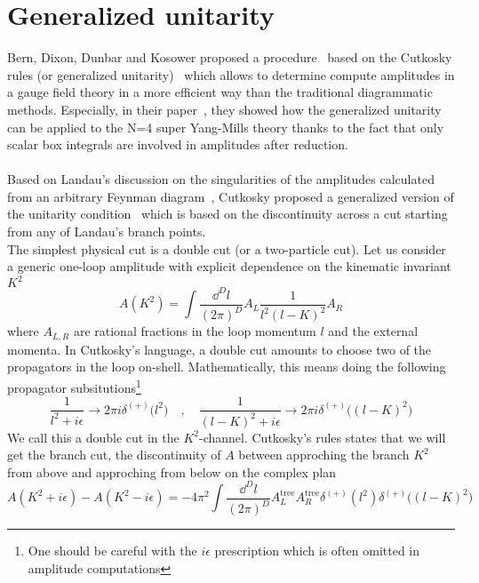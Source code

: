 \section{Generalized unitarity}\label{sect-unitarity}
Bern, Dixon, Dunbar and Kosower proposed a procedure~\cite{Bern:1994zx} based on the Cutkosky rules (or generalized unitarity)~\cite{doi:10.1063/1.1703676} which allows to determine compute amplitudes in a gauge field theory in a more efficient way than the traditional diagrammatic methods. 
Especially, in their paper~\cite{Bern:1994zx}, they showed how the generalized unitarity can be applied to the N=4 super Yang-Mills theory thanks to the fact that only scalar box integrals are involved in amplitudes after reduction.
\\\\
Based on Landau's discussion on the singularities of the amplitudes calculated from an arbitrary Feynman diagram~\cite{LANDAU1959181}, 
Cutkosky proposed a generalized version of the unitarity condition~\cite{doi:10.1063/1.1703676} which is based on the discontinuity across a cut starting from any of Landau's branch points.
\\
The simplest physical cut is a double cut (or a two-particle cut).
Let us consider a generic one-loop amplitude with explicit dependence on the kinematic invariant $K^2$
\begin{equation*}
A(K^2) = \int\frac{\dd^D l}{(2\pi)^D} A_L\frac{1}{l^{2} (l-K)^{2}}A_R
\end{equation*}
where $A_{L,R}$ are rational fractions in the loop momentum $l$ and the external momenta. 
In Cutkosky's language, a double cut amounts to choose two of the propagators in the loop on-shell.
Mathematically, this means doing the following propagator subsitutions\footnote{One should be careful with the $i\epsilon$ prescription which is often omitted in amplitude computations}
\begin{equation}\label{on-shell_propagator}
\frac{1}{l^2 + i\epsilon} \rightarrow 2\pi i\delta^{(+)}\big(l^2\big)
\quad,\quad
\frac{1}{(l-K)^2 + i\epsilon} \rightarrow 2\pi i\delta^{(+)}\big((l-K)^2\big)
\end{equation}
We call this a double cut in the $K^2$-channel.
Cutkosky's rules states that we will get the branch cut, \ie the discontinuity of $A$ between approching the branch $K^2$ from above and approching from below on the complex plan
\begin{equation}\label{cutkosky}
A(K^2 + i\epsilon) - A(K^2 - i\epsilon) =
-4\pi^2 \int\frac{\dd^D l}{(2\pi)^D}A^{\mathrm{tree}}_LA^{\mathrm{tree}}_R \delta^{(+)}(l^2)\delta^{(+)}\big((l-K)^2\big) 
\end{equation}
